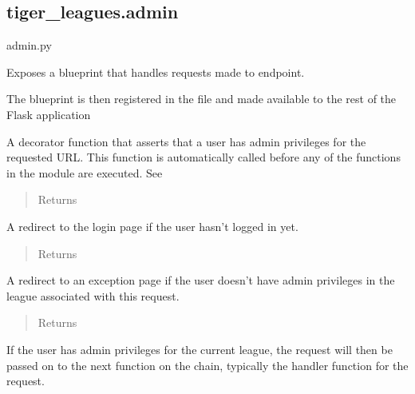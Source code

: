 \documentclass[letterpaper,10pt,english]{sphinxmanual}
\begin{document}
\subsection{tiger\_leagues.admin}
\label{\detokenize{tiger_leagues/readme:module-tiger_leagues.admin}}\label{\detokenize{tiger_leagues/readme:tiger-leagues-admin}}
admin.py

Exposes a blueprint that handles requests made to  endpoint.

The blueprint is then registered in the  file and made available 
to the rest of the Flask application

\begin{fulllineitems}
\label{\detokenize{tiger_leagues/readme:tiger_leagues.admin.admin_status_required}}
A decorator function that asserts that a user has admin privileges for the 
requested URL. This function is automatically called before any of the 
functions in the  module are executed. See 
\begin{quote}\begin{description}
\item[{Returns}] \leavevmode
{}

\end{description}\end{quote}

A redirect to the login page if the user hasn’t logged in yet.
\begin{quote}\begin{description}
\item[{Returns}] \leavevmode
{}

\end{description}\end{quote}

A redirect to an exception page if the user doesn’t have admin privileges in 
the league associated with this request.
\begin{quote}\begin{description}
\item[{Returns}] \leavevmode
{}

\end{description}\end{quote}

If the user has admin privileges for the current league, the request will 
then be passed on to the next function on the chain, typically the handler 
function for the request.

\end{fulllineitems}
\end{document}
